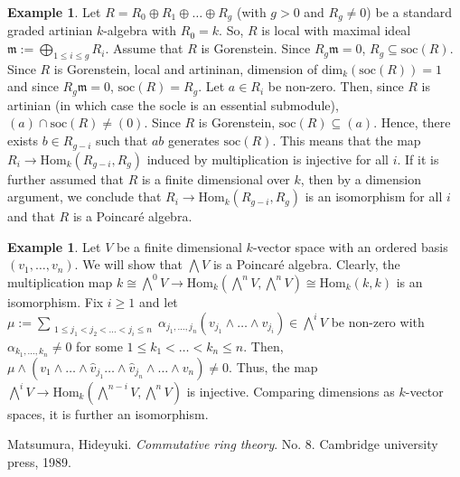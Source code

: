 \documentclass[oneside,11pt,reqno]{amsart}
\theoremstyle{definition}
\newtheorem{ex}[thm]{Example}
\theoremstyle{remark}
\begin{document}
\begin{ex}
	Let $R=R_{0} \oplus R_{1} \oplus \ldots  \oplus R_{g}$ (with $g>0$ and $R_{g}\neq 0$) be a standard graded artinian $k$-algebra with $R_{0}=k$. So, $R$ is local with maximal ideal $\mathfrak{m}:=\bigoplus_{1\leqslant i \leqslant  g} R_{i}$. Assume that $R$ is Gorenstein. Since $R_{g}\mathfrak{m} =0$, $R_{g}\subseteq \text{soc}(R)$. { Since $R$ is Gorenstein, local and artininan, dimension of $\text{dim}_{k}(\text{soc}(R))=1$} and since $R_{g}\mathfrak{m}=0$, $\text{soc}(R)=R_{g}$. Let $a\in R_{i}$ be non-zero. Then, since $R$ is artinian ({in which case the socle is an essential submodule}), $(a)\cap \text{soc}(R)\neq (0)$. Since $R$ is Gorenstein, $\text{soc}(R)\subseteq (a)$. Hence, there exists $b\in R_{g-i}$ such that $ab$ generates $\text{soc}(R) $. This means that the map $R_{i}\rightarrow \text{Hom}_{k}(R_{g-i},R_{g})$ induced by multiplication is injective for all $i$. If it is further assumed that $R$ is a finite dimensional over $k$, then by a dimension argument, we conclude that $R_{i}\rightarrow \text{Hom}_{k}(R_{g-i},R_{g})$ is an isomorphism for all $i$ and that $R$ is a Poincar\'{e} algebra.  
\end{ex}

\begin{ex}
	Let $V$ be a finite dimensional $k$-vector space with an ordered basis $( v_{1},\ldots ,v_{n} )$. We will show that $\bigwedge V$ is a Poincar\'{e} algebra. Clearly, the multiplication map $k \cong \bigwedge ^{0} V \rightarrow \text{Hom}_{k}(\bigwedge ^{n} V , \bigwedge ^{n } V) \cong \text{Hom}_{k}(k,k)$ is an isomorphism. Fix $i \geqslant 1$ and let $\mu :=\sum_{\substack{1\leqslant j_{1}<j_{2}<\ldots <j_{i}\leqslant n}}^{} \alpha _{j_{1},\ldots ,j_{n}} (v_{j_{1}} \wedge \ldots \wedge v_{j_{i}})\in \bigwedge^{i}V$ be non-zero with $\alpha _{k_{1},\ldots ,k_{n}}\neq 0$ for some $1\leqslant k_{1}<\ldots <k_{n}\leqslant n$. Then, $\mu \wedge (v_{1}\wedge \ldots \wedge \hat v_{j_{1}}\ldots \wedge \hat v_{j_{n}}\wedge \ldots  \wedge v_{n}) \neq 0$. Thus, the map $\bigwedge ^{i} V \rightarrow \text{Hom}_{k}(\bigwedge ^{n-i} V, \bigwedge^{n} V)$ is injective. Comparing dimensions as $k$-vector spaces, it is further an isomorphism.
\end{ex}







\begin{thebibliography}{Neil1234}
	
 Matsumura, Hideyuki. \emph{Commutative ring theory}. No. 8. Cambridge university press, 1989.
\end{thebibliography}
\end{document}
